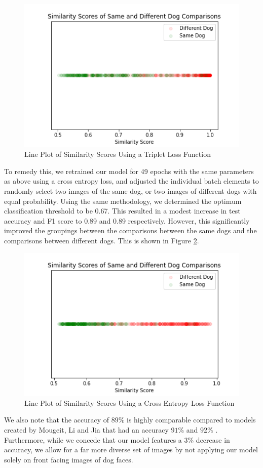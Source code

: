 \documentclass{article}
\begin{document}
\begin{figure}[h]
\centering
	\includegraphics[scale=0.7]{final-report-images/triplet_lineplot.png}
\caption{Line Plot of Similarity Scores Using a Triplet Loss Function}
\label{fig:x triplet lineplot}
\end{figure}
\noindent To remedy this, we retrained our model for 49 epochs with the same parameters as above using a cross entropy loss, and adjusted the individual batch elements to randomly select two images of the same dog, or two images of different dogs with equal probability.  Using the same methodology, we determined the optimum classification threshold to be 0.67.  This resulted in a modest increase in test accuracy and F1 score to 0.89 and 0.89 respectively.  However, this significantly improved the groupings between the comparisons between the same dogs and the comparisons between different dogs. This is shown in Figure \ref{fig:x triplet lineplot}. 

\begin{figure}[h]
\centering
	\includegraphics[scale=0.7]{final-report-images/crossentropy_lineplot.png}
\caption{Line Plot of Similarity Scores Using a Cross Entropy Loss Function}
\label{fig:x triplet lineplot}
\end{figure}
\noident We also note that the accuracy of $89\%$ is highly comparable compared to models created by Mougeit, Li and Jia that had an accuracy $91\%$ and $92\%$ \cite{MougeotGuillaume2019ADLA}.  Furthermore, while we concede that our model features a $3\%$ decrease in accuracy, we allow for a far more diverse set of images by not applying our model solely on front facing images of dog faces.
\end{document}
